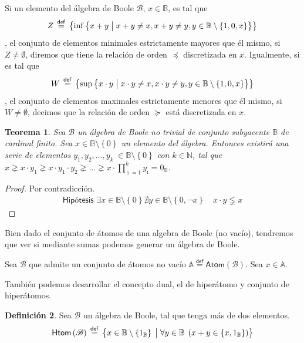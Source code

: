\documentclass[final,12pt,a4paper,twoside,fleqn]{extbook}
\newcommand{\mathdef}{\ensuremath{\stackrel{\mathsf{def}}{{}={}}}}
\newcommand{\set}[1]{\ensuremath{\left\lbrace{#1}\right\rbrace}}
\newcommand {\setCompr}[2]{
	\ensuremath{
		\left\lbrace{ 
			#1 {\;\big{\vert}\;} #2
        }\right\rbrace
    }
}
\newcommand{\setN}{\ensuremath{\mathds{N}}}
\newcommand{\setB}{\ensuremath{\mathbb{B}}}
\newcommand{\algB}{\ensuremath{\mathscr{B}}}
\newtheorem{thm}{Teorema}[chapter]
\theoremstyle{definition}
\newtheorem{defn}[thm]{Definición}
\theoremstyle{remark}
\begin{document}
	Si un elemento del álgebra de Boole \(\algB\), \(x \in \setB\), es tal
que \[ Z \mathdef \set{\inf\setCompr{x+y}{ x+y \neq x , x+y \neq y , y \in
\setB\setminus\set{1,0,x}}}\], el conjunto de elementos minimales
estrictamente mayores que él mismo, si \(Z \neq \emptyset\), diremos que
tiene la relación de orden \(\preccurlyeq\) discretizada en \(x\).
Igualmente, si es tal que  \[ W \mathdef \set{\sup\setCompr{x \cdot y}{ x
\cdot y \neq x , x \cdot y \neq y , y \in \setB\setminus\set{1,0,x}}} \], el
conjunto de elementos maximales estrictamente menores que él mismo, si \( W
\neq \emptyset \), decimos que la relación de orden \(\succcurlyeq\) está
discretizada en \(x\).




\begin{thm}
Sea \(\algB\) un álgebra de Boole no trivial de conjunto subyacente \(\setB\)
de cardinal finito. Sea \(x \in \setB\setminus\set{0} \) un elemento del
álgebra. Entonces existirá una serie de elementos \(y_1, y_2, \ldots ,
y_k\;\in\setB\setminus\set{0}\) con \(k \in \setN\), tal que \( x \gneq x
\cdot y_1 \gneq x \cdot y_1 \cdot y_2 \gneq \ldots \gneq x \cdot
{\prod}_{\imath=1}^{k} y_{\imath} = 0_{\setB}\).
\end{thm}



\begin{proof}
Por contradicción.
\begin{eqnarray}
\textsf{Hipótesis  } \exists x \in \setB\setminus\set{0} \nexists y \in \setB\setminus\set{0,\neg x}\quad x \cdot y \lneqq x
\end{eqnarray}
\end{proof}



	Bien dado el conjunto de átomos de una algebra de Boole (no vacío),
tendremos que ver si mediante sumas podemos generar un álgebra de Boole.



	Sea \( \algB \) que admite un conjunto de átomos no vacío \( \mathbb{A}
\mathdef \mathsf{Atom} \left( \algB \right) \). Sea \( x \in \mathbb{A} \).






	También podemos desarrollar el concepto dual, el de hiperátomo y conjunto de hiperátomos. 



\begin{defn}
Sea \(\algB\) un álgebra de Boole, tal que tenga más de dos elementos.
\begin{equation}
  \mathsf{Htom}\left(\algB\right) \mathdef \setCompr{x \in \setB \setminus
  \set{1_\setB}} {\forall y \in \setB \; \left( x + y \in \set{ x ,
  1_\setB } \right)}
\end{equation}
\end{defn}
\end{document}
